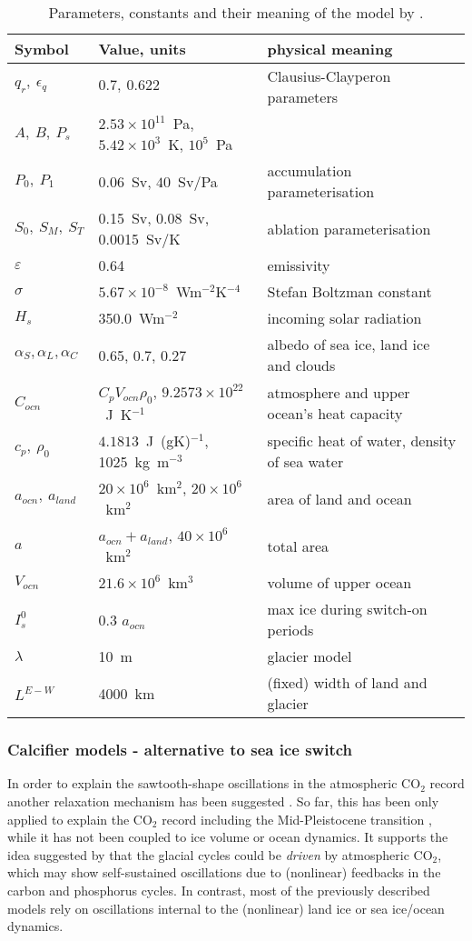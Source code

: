 \documentclass[12pt]{article}
\begin{document}
\begin{table}[h!]
\small{
\begin{tabular}{lll}
\hline
Symbol & Value, units & physical meaning\\
\hline
$q_r,\ \epsilon_q$ & $0.7,\ 0.622$ & Clausius-Clayperon parameters\\
$A,\ B,\ P_s$ & $2.53\times 10^{11}$~Pa, $5.42\times 10^3$~K, $10^5$~Pa & \\
$P_0,\ P_1$ & $0.06$~Sv, $40$~Sv/Pa & accumulation parameterisation\\
$S_0,\ S_M,\ S_T$ & 0.15~Sv, 0.08~Sv, 0.0015~Sv/K & ablation parameterisation\\
$\varepsilon$ & 0.64 & emissivity\\
$\sigma$ & $5.67\times 10^{-8}$~Wm$^{-2}$K$^{-4}$ & Stefan Boltzman constant\\
$H_s$ & 350.0~Wm$^{-2}$ & incoming solar radiation\\
$\alpha_S, \alpha_L, \alpha_C$ & 0.65, 0.7, 0.27 & albedo of sea ice, land ice and clouds\\
$C_{ocn}$ & $C_pV_{ocn}\rho_0$, $9.2573\times 10^{22}$~J~K$^{-1}$ & atmosphere and upper ocean's heat capacity\\
$c_p,\ \rho_0$ & $4.1813$~J~(gK)$^{-1}$, 1025~kg~m$^{-3}$ & specific heat of water, density of sea water\\
$a_{ocn},\ a_{land}$ & $20\times 10^6$~km$^2$, $20\times 10^6$~km$^2$ & area of land and ocean\\
$a$ & $a_{ocn}+a_{land}$, $40\times 10^6$~km$^2$ & total area\\
$V_{ocn}$ & $21.6\times 10^6$~km$^3$ & volume of upper ocean\\
$I_s^0$ & 0.3 $a_{ocn}$ & max ice during switch-on periods\\
$\lambda$ & 10~m & glacier model\\
$L^{E-W}$ & 4000~km & (fixed) width of land and glacier\\
\hline
\end{tabular}}
\label{t:GT03}
\caption{Parameters, constants and their meaning of the model by \cite{Tziperman2003}. }
\end{table}


\subsubsection{Calcifier models - alternative to sea ice switch}
In order to explain the sawtooth-shape oscillations in the atmospheric CO$_2$ record another relaxation mechanism has been suggested \cite{Omta:2013dl}. So far, this has been only applied to explain the CO$_2$ record including the Mid-Pleistocene transition \cite{Omta:2015cc}, while it has not been coupled to ice volume or ocean dynamics. It supports the idea suggested by \cite{Wallmann:2014dc} that the glacial cycles could be {\em driven} by atmospheric CO$_2$, which may show self-sustained oscillations due to (nonlinear) feedbacks in the carbon and phosphorus cycles. In contrast, most of the previously described models rely on oscillations internal to the (nonlinear) land ice or sea ice/ocean dynamics. 
\end{document}
